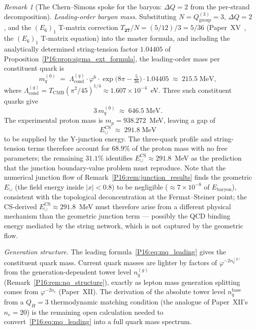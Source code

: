 \documentclass[11pt,a4paper]{article}
\theoremstyle{definition}\newtheorem{definition}[theorem]{Definition}
\theoremstyle{remark}
\newtheorem{remark}[theorem]{Remark}
\theoremstyle{definition}\newtheorem{construction}[theorem]{Construction}
\newcommand{\vp}{\varphi}
\newcommand{\TCMB}{T_{\mathrm{CMB}}}
\newcommand{\Lcond}{\Lambda_{\mathrm{cond}}}
\newcommand{\QH}{Q_H}
\begin{document}
\begin{remark}[The Chern--Simons spoke for the baryon: $\Delta Q=2$ from the per-strand decomposition]
\emph{Leading-order baryon mass.}
Substituting $N=Q_{\mathrm{group}}^{(3)}=3$, $\Delta Q=2$, and the
$(E_6)_1$ T-matrix correction $T_{\mathbf{27}}/N=(5/12)/3=5/36$
(Paper~XV~\cite{Paper15}, the $(E_6)_1$ T-matrix equation) %
into the master formula, and
including the analytically determined string-tension factor
$1.04405$ of Proposition~\ref{P16:prop:sigma_ext_formula}, the
leading-order mass per constituent quark is
\begin{equation}
  m_q^{(0)}
  \;=\; \Lcond^{(q)}\cdot\vp^6
  \cdot\exp\!\bigl(8\pi-\tfrac{5}{36}\bigr)\cdot 1.04405
  \;\approx\; 215.5\;\text{MeV},
  \label{P16:eq:mq_leading}
\end{equation}
where $\Lcond^{(q)}=\TCMB(\pi^2/45)^{1/4}\approx1.607\times10^{-4}$~eV.
Three such constituent quarks give
\begin{equation}
  3\,m_q^{(0)} \;\approx\; 646.5\;\text{MeV}.
  \label{P16:eq:mbaryon_leading}
\end{equation}
The experimental proton mass is $m_p=938.272$~MeV, leaving a gap of
\begin{equation}
  E_\cup^{\mathrm{CS}} \;\approx\; 291.8\;\text{MeV}
  \label{P16:eq:Ecup_required}
\end{equation}
to be supplied by the Y-junction energy.  The three-quark profile and
string-tension terms therefore account for $68.9\%$ of the proton
mass with no free parameters; the remaining $31.1\%$ identifies
$E_\cup^{\mathrm{CS}}\approx291.8$~MeV as the prediction that the junction
boundary-value problem must reproduce.  Note that the numerical
junction flow of Remark~\ref{P16:rem:junction_results} finds the geometric
$E_\cup$ (the field energy inside $|x|<0.8$) to be negligible
($\approx7\times10^{-8}$ of $E_{\mathrm{baryon}}$), consistent with
the topological deconcentration at the Fermat--Steiner point; the
CS-derived $E_\cup^{\mathrm{CS}}\approx291.8$~MeV must therefore arise
from a different physical mechanism than the geometric junction term ---
possibly the QCD binding energy mediated by the string network,
which is not captured by the geometric flow.

\emph{Generation structure.}
The leading formula~\eqref{P16:eq:mq_leading} gives the constituent
quark mass.  Current quark masses are lighter by factors of
$\vp^{-2n_q^{(g)}}$ from the generation-dependent tower level
$n_q^{(g)}$ (Remark~\ref{P16:rem:nq_structure}), exactly as lepton
mass generation splitting comes from $\vp^{-2n_e}$ (Paper~XII).
The derivation of the absolute tower level $n_q^{\mathrm{base}}$
from a $\QH=3$ thermodynamic matching condition (the analogue of
Paper~XII's $n_e=20$) is the remaining open calculation needed to
convert~\eqref{P16:eq:mq_leading} into a full quark mass spectrum.
\end{remark}
\end{document}
